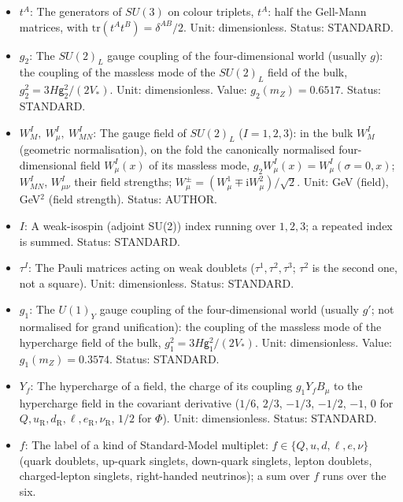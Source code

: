 \documentclass[
  10pt,
]{article}
\begin{document}
\begin{itemize}
  \(A\): A colour (adjoint SU(3)) index running over \(1, \dots, 8\); a
  repeated index is summed. Status: STANDARD.
\item
  \(t^A\): The generators of \(SU(3)\) on colour triplets, \(t^A\): half
  the Gell-Mann matrices, with \(\mathrm{tr}(t^At^B) = \delta^{AB}/2\).
  Unit: dimensionless. Status: STANDARD.
\item
  \(g_2\): The \(SU(2)_L\) gauge coupling of the four-dimensional world
  (usually \(g\)): the coupling of the massless mode of the \(SU(2)_L\)
  field of the bulk, \(g_2^2 = 3H\mathsf{g}_2^2/(2V_*)\). Unit:
  dimensionless. Value: \(g_2(m_Z) = 0.6517\). Status: STANDARD.
\item
  \(W^I_M,\ W^I_\mu,\ W^I_{MN}\): The gauge field of \(SU(2)_L\)
  (\(I = 1, 2, 3\)): in the bulk \(W^I_M\) (geometric normalisation), on
  the fold the canonically normalised four-dimensional field
  \(W^I_\mu(x)\) of its massless mode,
  \(g_2W^I_\mu(x) = W^I_\mu(\sigma = 0, x)\); \(W^I_{MN}\),
  \(W^I_{\mu\nu}\) their field strengths;
  \(W^\pm_\mu = (W^1_\mu \mp \mathrm{i}W^2_\mu)/\sqrt2\). Unit: GeV
  (field), GeV\(^2\) (field strength). Status: AUTHOR.
\item
  \(I\): A weak-isospin (adjoint SU(2)) index running over \(1, 2, 3\);
  a repeated index is summed. Status: STANDARD.
\item
  \(\tau^I\): The Pauli matrices acting on weak doublets
  (\(\tau^1, \tau^2, \tau^3\); \(\tau^2\) is the second one, not a
  square). Unit: dimensionless. Status: STANDARD.
\item
  \(g_1\): The \(U(1)_Y\) gauge coupling of the four-dimensional world
  (usually \(g'\); not normalised for grand unification): the coupling
  of the massless mode of the hypercharge field of the bulk,
  \(g_1^2 = 3H\mathsf{g}_1^2/(2V_*)\). Unit: dimensionless. Value:
  \(g_1(m_Z) = 0.3574\). Status: STANDARD.
\item
  \(Y_f\): The hypercharge of a field, the charge of its coupling
  \(g_1Y_fB_\mu\) to the hypercharge field in the covariant derivative
  (\(1/6\), \(2/3\), \(-1/3\), \(-1/2\), \(-1\), \(0\) for
  \(Q, u_{\mathrm{R}}, d_{\mathrm{R}}, \ell, e_{\mathrm{R}}, \nu_{\mathrm{R}}\),
  \(1/2\) for \(\Phi\)). Unit: dimensionless. Status: STANDARD.
\item
  \(f\): The label of a kind of Standard-Model multiplet:
  \(f \in \{Q, u, d, \ell, e, \nu\}\) (quark doublets, up-quark
  singlets, down-quark singlets, lepton doublets, charged-lepton
  singlets, right-handed neutrinos); a sum over \(f\) runs over the six.

\end{itemize}
\end{document}
